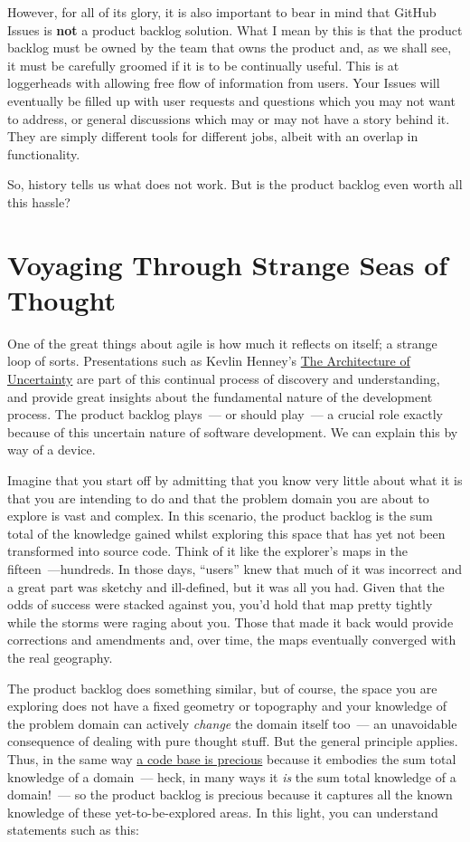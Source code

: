 \documentclass{book}
\begin{document}
However, for all of its glory, it is also important to bear in mind
that GitHub Issues is \textbf{not} a product backlog solution. What I mean by
this is that the product backlog must be owned by the team that owns
the product and, as we shall see, it must be carefully groomed if it
is to be continually useful. This is at loggerheads with allowing free
flow of information from users. Your Issues will eventually be filled
up with user requests and questions which you may not want to address,
or general discussions which may or may not have a story behind
it. They are simply different tools for different jobs, albeit with an
overlap in functionality.

So, history tells us what does not work. But is the product backlog
even worth all this hassle?

\section{Voyaging Through Strange Seas of Thought}

One of the great things about agile is how much it reflects on itself;
a strange loop of sorts. Presentations such as Kevlin Henney's
\href{http://www.infoq.com/presentations/architecture-uncertainty}{The
  Architecture of Uncertainty} are part of this continual process of
discovery and understanding, and provide great insights about the
fundamental nature of the development process. The product backlog
plays~--- or should play~--- a crucial role exactly because of this
uncertain nature of software development. We can explain this by way
of a device.

Imagine that you start off by admitting that you know very little
about what it is that you are intending to do and that the problem
domain you are about to explore is vast and complex. In this scenario,
the product backlog is the sum total of the knowledge gained whilst
exploring this space that has yet not been transformed into source
code. Think of it like the explorer's maps in the fifteen~---hundreds. In
those days, ``users'' knew that much of it was incorrect and a great
part was sketchy and ill-defined, but it was all you had. Given that
the odds of success were stacked against you, you'd hold that map
pretty tightly while the storms were raging about you. Those that made
it back would provide corrections and amendments and, over time, the
maps eventually converged with the real geography.

The product backlog does something similar, but of course, the space
you are exploring does not have a fixed geometry or topography and
your knowledge of the problem domain can actively \emph{change} the
domain itself too~--- an unavoidable consequence of dealing with pure
thought stuff. But the general principle applies. Thus, in the same
way \href{http://www.joelonsoftware.com/articles/fog0000000069.html}{a
  code base is precious} because it embodies the sum total knowledge
of a domain~--- heck, in many ways it \emph{is} the sum total
knowledge of a domain!~--- so the product backlog is precious because
it captures all the known knowledge of these yet-to-be-explored
areas. In this light, you can understand statements such as this:
\end{document}
